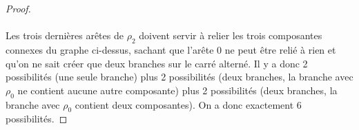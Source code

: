 \begin{proof}
  \paragraph{}
  Les trois dernières arêtes de $\rho_2$ doivent servir à relier les trois composantes connexes du graphe ci-dessus, sachant que l'arête 0 ne peut être relié à rien et qu'on ne sait créer que deux branches sur le carré alterné. Il y a donc 2 possibilités (une seule branche) plus 2 possibilités (deux branches, la branche avec $\rho_0$ ne contient aucune autre composante) plus 2 possibilités (deux branches, la branche avec $\rho_0$ contient deux composantes). On a donc exactement 6 possibilités.

\end{proof}
